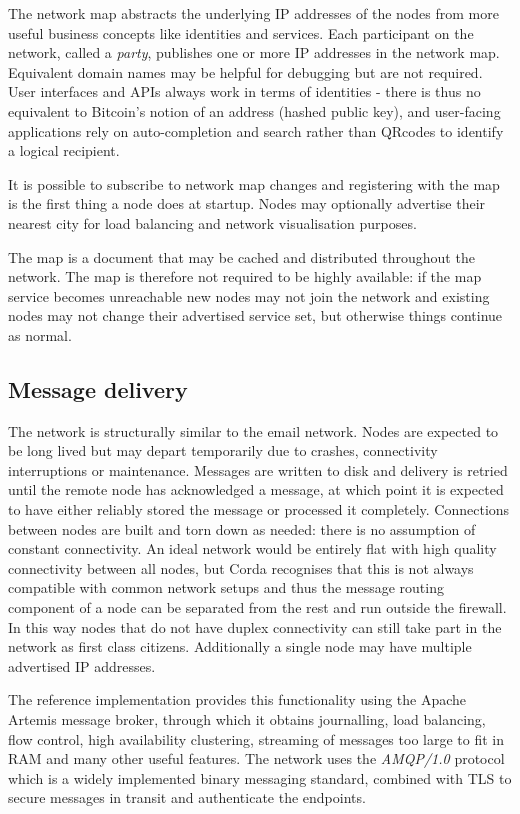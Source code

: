 \documentclass{article}
\begin{document}
The network map abstracts the underlying IP addresses of the nodes from more useful business concepts like identities
and services. Each participant on the network, called a \emph{party}, publishes one or more IP addresses in the
network map. Equivalent domain names may be helpful for debugging but are not required. User interfaces and APIs
always work in terms of identities - there is thus no equivalent to Bitcoin's notion of an address (hashed public key),
and user-facing applications rely on auto-completion and search rather than QRcodes to identify a logical recipient.

It is possible to subscribe to network map changes and registering with the map is the first thing a node does at
startup. Nodes may optionally advertise their nearest city for load balancing and network visualisation purposes.

The map is a document that may be cached and distributed throughout the network. The map is therefore not required
to be highly available: if the map service becomes unreachable new nodes may not join the network and existing nodes
may not change their advertised service set, but otherwise things continue as normal.

\subsection{Message delivery}

The network is structurally similar to the email network. Nodes are expected to be long lived but may depart
temporarily due to crashes, connectivity interruptions or maintenance. Messages are written to disk
and delivery is retried until the remote node has acknowledged a message, at which point it is expected to have
either reliably stored the message or processed it completely. Connections between nodes are built and torn down as
needed: there is no assumption of constant connectivity. An ideal network would be entirely flat with high quality
connectivity between all nodes, but Corda recognises that this is not always compatible with common network
setups and thus the message routing component of a node can be separated from the rest and run outside the firewall.
In this way nodes that do not have duplex connectivity can still take part in the network as first class citizens.
Additionally a single node may have multiple advertised IP addresses.

The reference implementation provides this functionality using the Apache Artemis message broker, through which it
obtains journalling, load balancing, flow control, high availability clustering, streaming of messages too large to fit
in RAM and many other useful features. The network uses the \emph{AMQP/1.0}\cite{AMQP} protocol which is a widely
implemented binary messaging standard, combined with TLS to secure messages in transit and authenticate the endpoints.
\end{document}
